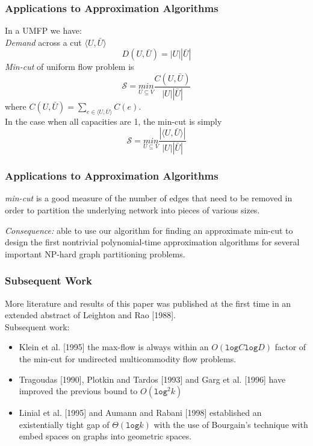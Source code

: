 \begin{frame}
\frametitle{Applications to Approximation Algorithms}
In a UMFP we have:\\
\textit{Demand} across a cut $\langle U, \bar{U} \rangle$ 
$$D(U,\bar{U}) = |U||\bar{U}|$$
\textit{Min-cut} of uniform flow problem is
$$ \mathscr{S} = \underset{U \subseteq V}{min} \frac{C(U,\bar{U})}{ |U||\bar{U}|}$$
where $C(U,\bar{U}) = \sum_{e \in \langle U, \bar{U} \rangle } C(e)$.\\
In the case when all capacities are 1, the min-cut is simply
$$ \mathscr{S} = \underset{U \subseteq V}{min} \frac{| \langle U,\bar{U}\rangle |}{ |U||\bar{U}|}$$
\end{frame}

\begin{frame}
\frametitle{Applications to Approximation Algorithms}
\textit{min-cut} is a good measure of the number of edges that need to be removed in order to partition the underlying network into pieces of various sizes.

\textit{Consequence:} able to use our algorithm for finding an approximate min-cut to design the first nontrivial polynomial-time approximation algorithms for several important NP-hard graph partitioning problems.
\end{frame}


\begin{frame}
\frametitle{Subsequent Work}
More literature and results of this paper was published at the first time in an extended abstract of Leighton and Rao [1988].\\

Subsequent work:
\begin{itemize}
	\item Klein et al. [1995] the max-flow is always within an $O(\texttt{log} C \texttt{log} D)$ factor of the min-cut for undirected multicommodity flow problems.
	\item Tragoudas [1990], Plotkin and Tardos [1993] and Garg et al. [1996] have improved the previous bound to $O(\texttt{log}^2 k)$
	\item Linial  et al. [1995] and Aumann and Rabani [1998] established an existentially tight gap of $\Theta(\texttt{log} k)$ with the use of Bourgain's technique with embed spaces on graphs into geometric spaces.
\end{itemize}
\end{frame}	

